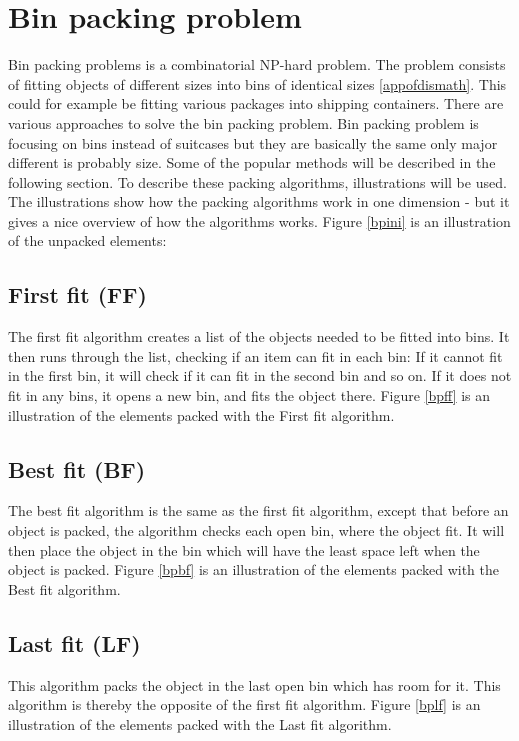 

\section{Bin packing problem}
\label{sec:binpacking}
Bin packing problems is a combinatorial NP-hard problem. The problem consists of fitting objects of different sizes into bins of identical sizes \ref{appofdismath}. This could for example be fitting various packages into shipping containers. There are various approaches to solve the bin packing problem. Bin packing problem is focusing on bins instead of suitcases but they are basically the same only major different is probably size. Some of the popular methods will be described in the following section. To describe these packing algorithms, illustrations will be used. The illustrations show how the packing algorithms work in one dimension - but it gives a nice overview of how the algorithms works. Figure  \ref{bpini} is an illustration of the unpacked elements:



\subsection{First fit (FF)}
The first fit algorithm creates a list of the objects needed to be fitted into bins. It then runs through the list, checking if an item can fit in each bin: If it cannot fit in the first bin, it will check if it can fit in the second bin and so on. If it does not fit in any bins, it opens a new bin, and fits the object there. Figure \ref{bpff} is an illustration of the elements packed with the First fit algorithm.


\subsection{Best fit (BF)}
The best fit algorithm is the same as the first fit algorithm, except that before an object is packed, the algorithm checks each open bin, where the object fit. It will then place the object in the bin which will have the least space left when the object is packed. Figure \ref{bpbf} is an illustration of the elements packed with the Best fit algorithm.

\subsection{Last fit (LF)}
This algorithm packs the object in the last open bin which has room for it. This algorithm is thereby the opposite of the first fit algorithm. Figure \ref{bplf} is an illustration of the elements packed with the Last fit algorithm.


